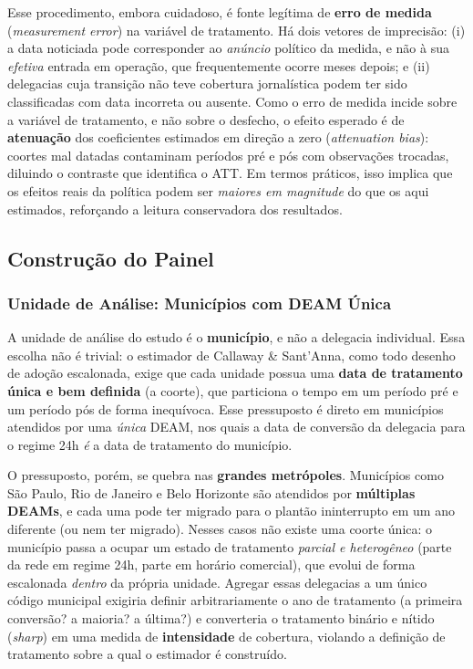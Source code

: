 \documentclass[twocolumn, 10pt]{article}
\begin{document}
Esse procedimento, embora cuidadoso, é fonte legítima de \textbf{erro de medida}
(\textit{measurement error}) na variável de tratamento. Há dois vetores de
imprecisão: (i) a data noticiada pode corresponder ao \textit{anúncio} político
da medida, e não à sua \textit{efetiva} entrada em operação, que frequentemente
ocorre meses depois; e (ii) delegacias cuja transição não teve cobertura
jornalística podem ter sido classificadas com data incorreta ou ausente. Como o
erro de medida incide sobre a variável de tratamento, e não sobre o desfecho,
o efeito esperado é de \textbf{atenuação} dos coeficientes estimados em direção
a zero (\textit{attenuation bias}): coortes mal datadas contaminam períodos
pré e pós com observações trocadas, diluindo o contraste que identifica o ATT.
Em termos práticos, isso implica que os efeitos reais da política podem ser
\textit{maiores em magnitude} do que os aqui estimados, reforçando a leitura
conservadora dos resultados.

\subsection{Construção do Painel}

\subsubsection{Unidade de Análise: Municípios com DEAM Única}
\label{sec:unidade}
A unidade de análise do estudo é o \textbf{município}, e não a delegacia
individual. Essa escolha não é trivial: o estimador de Callaway \& Sant'Anna,
como todo desenho de adoção escalonada, exige que cada unidade possua uma
\textbf{data de tratamento única e bem definida} (a coorte), que particiona o
tempo em um período pré e um período pós de forma inequívoca. Esse pressuposto
é direto em municípios atendidos por uma \textit{única} DEAM, nos quais a data
de conversão da delegacia para o regime 24h \textit{é} a data de tratamento do
município.

O pressuposto, porém, se quebra nas \textbf{grandes metrópoles}. Municípios como
São Paulo, Rio de Janeiro e Belo Horizonte são atendidos por \textbf{múltiplas
DEAMs}, e cada uma pode ter migrado para o plantão ininterrupto em um ano
diferente (ou nem ter migrado). Nesses casos não existe uma coorte única: o
município passa a ocupar um estado de tratamento \textit{parcial e heterogêneo}
(parte da rede em regime 24h, parte em horário comercial), que evolui de forma
escalonada \textit{dentro} da própria unidade. Agregar essas delegacias a um
único código municipal exigiria definir arbitrariamente o ano de tratamento (a
primeira conversão? a maioria? a última?) e converteria o tratamento binário e
nítido (\textit{sharp}) em uma medida de \textbf{intensidade} de cobertura,
violando a definição de tratamento sobre a qual o estimador é construído.
\end{document}
